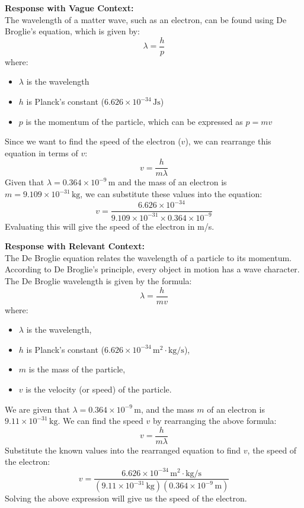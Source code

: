 \documentclass{article}
\begin{document}
\bigskip

\textbf{Response with Vague Context:} \\
The wavelength of a matter wave, such as an electron, can be found using De Broglie's equation, which is given by:
\[
\lambda = \frac{h}{p}
\]
where:
\begin{itemize}
    \item \( \lambda \) is the wavelength
    \item \( h \) is Planck's constant (\( 6.626 \times 10^{-34} \, \text{Js} \))
    \item \( p \) is the momentum of the particle, which can be expressed as \( p = mv \)
\end{itemize}
Since we want to find the speed of the electron (\( v \)), we can rearrange this equation in terms of \( v \):
\[
v = \frac{h}{m\lambda}
\]
Given that \( \lambda = 0.364 \times 10^{-9} \, \text{m} \) and the mass of an electron is \( m = 9.109 \times 10^{-31} \, \text{kg} \), we can substitute these values into the equation:
\[
v = \frac{6.626 \times 10^{-34}}{9.109 \times 10^{-31} \times 0.364 \times 10^{-9}}
\]
Evaluating this will give the speed of the electron in m/s.

\bigskip

\textbf{Response with Relevant Context:} \\
The De Broglie equation relates the wavelength of a particle to its momentum. According to De Broglie's principle, every object in motion has a wave character. The De Broglie wavelength is given by the formula:
\[
\lambda = \frac{h}{mv}
\]
where:
\begin{itemize}
    \item \( \lambda \) is the wavelength,
    \item \( h \) is Planck's constant (\( 6.626 \times 10^{-34} \, \text{m}^2 \cdot \text{kg} / \text{s} \)),
    \item \( m \) is the mass of the particle,
    \item \( v \) is the velocity (or speed) of the particle.
\end{itemize}
We are given that \( \lambda = 0.364 \times 10^{-9} \, \text{m} \), and the mass \( m \) of an electron is \( 9.11 \times 10^{-31} \, \text{kg} \). We can find the speed \( v \) by rearranging the above formula:
\[
v = \frac{h}{m\lambda}
\]
Substitute the known values into the rearranged equation to find \( v \), the speed of the electron:
\[
v = \frac{6.626 \times 10^{-34} \, \text{m}^2 \cdot \text{kg} / \text{s} }{(9.11 \times 10^{-31} \, \text{kg}) (0.364 \times 10^{-9} \, \text{m})}
\]
Solving the above expression will give us the speed of the electron.
\end{document}
